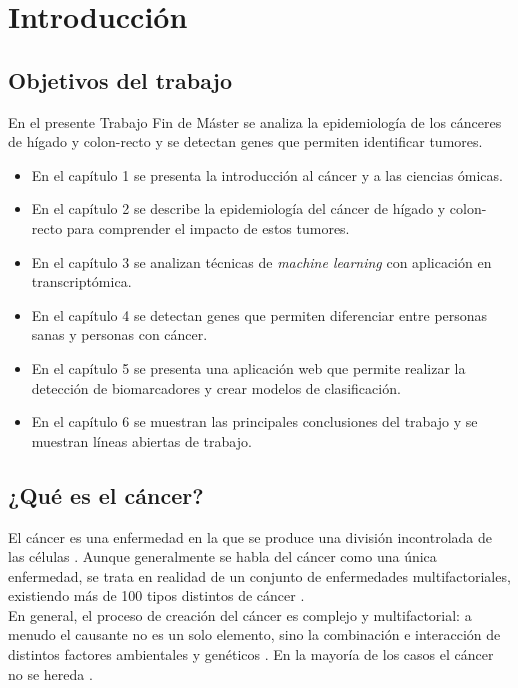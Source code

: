 \chapter{Introducción}

\section{Objetivos del trabajo}

En el presente Trabajo Fin de Máster se analiza la epidemiología de los cánceres de hígado y colon-recto y se detectan genes que permiten identificar tumores.

\begin{itemize}
	\item En el capítulo 1 se presenta la introducción al cáncer y a las ciencias ómicas.
	\item En el capítulo 2 se describe la epidemiología del cáncer de hígado y colon-recto para comprender el impacto de estos tumores.
	\item En el capítulo 3 se analizan técnicas de \textit{machine learning} con aplicación en transcriptómica.
	\item En el capítulo 4 se detectan genes que permiten diferenciar entre personas sanas y personas con cáncer.
	\item En el capítulo 5 se presenta una aplicación web que permite realizar la detección de biomarcadores y crear modelos de clasificación.
	\item En el capítulo 6 se muestran las principales conclusiones del trabajo y se muestran líneas abiertas de trabajo.
\end{itemize}


\section{¿Qué es el cáncer?}

El cáncer es una enfermedad en la que se produce una división incontrolada de las células \cite{AmericanCancerSociety2015}. Aunque generalmente se habla del cáncer como una única enfermedad, se trata en realidad de un conjunto de enfermedades multifactoriales, existiendo más de 100 tipos distintos de cáncer \cite{NationalCancerInstitute2015}.\\

En general, el proceso de creación del cáncer es complejo y multifactorial: a menudo el causante no es un solo elemento, sino la combinación e interacción de distintos factores ambientales y genéticos \cite{Migliore2012}. En la mayoría de los casos el cáncer no se hereda \cite{Pierce2010}. \\

